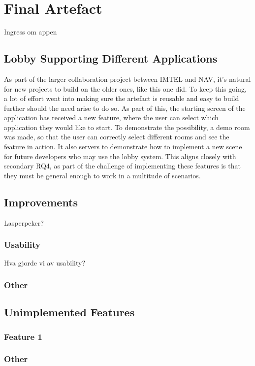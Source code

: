 \section{Final Artefact}
Ingress om appen


\subsection{Lobby Supporting Different Applications}
As part of the larger collaboration project between IMTEL and NAV, it's natural for new projects to build on the older ones, like this one did. To keep this going, a lot of effort went into making sure the artefact is reusable and easy to build further should the need arise to do so. As part of this, the starting screen of the application has received a new feature, where the user can select which application they would like to start. To demonstrate the possibility, a demo room was made, so that the user can correctly select different rooms and see the feature in action. It also servers to demonstrate how to implement a new scene for future developers who may use the lobby system. This aligns closely with secondary RQ4, as part of the challenge of implementing these features is that they must be general enough to work in a multitude of scenarios.




\subsection{Improvements}
Lasperpeker?
\subsubsection{Usability}
Hva gjorde vi av usability?
\subsubsection{Other}

\subsection{Unimplemented Features}
\subsubsection{Feature 1}
\subsubsection{Other}





